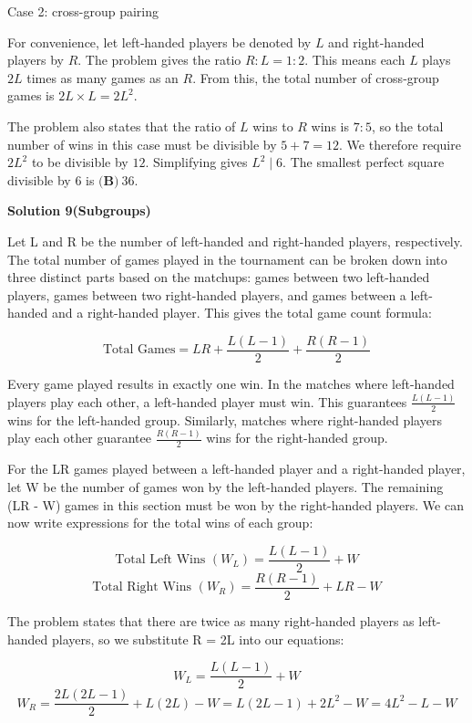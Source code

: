 \begin{enumerate}
 
Case 2: cross-group pairing

 
For convenience, let left‑handed players be denoted by \(L\) and right‑handed players by \(R\). The problem gives the ratio \(R : L = 1 : 2\). This means each \(L\) plays \(2L\) times as many games as an \(R\). From this, the total number of cross‑group games is \(2L \times L = 2L^2\).

 The problem also states that the ratio of \(L\) wins to \(R\) wins is \(7:5\), so the total number of wins in this case must be divisible by \(5 + 7 = 12\). We therefore require \(2L^2\) to be divisible by \(12\). Simplifying gives \(L^2 \mid 6\). The smallest perfect square divisible by \(6\) is \(\boxed{\textbf{(B)}\ 36}\).

 



\textbf{Solution 9(Subgroups)}

Let L and R be the number of left-handed and right-handed players, respectively. The total number of games played in the tournament can be broken down into three distinct parts based on the matchups: games between two left-handed players, games between two right-handed players, and games between a left-handed and a right-handed player. This gives the total game count formula:

 
 \[\text{Total Games} = LR + \frac{L(L-1)}{2} + \frac{R(R-1)}{2}\]

 Every game played results in exactly one win. In the matches where left-handed players play each other, a left-handed player must win. This guarantees $\frac{L(L-1)}{2}$ wins for the left-handed group. Similarly, matches where right-handed players play each other guarantee $\frac{R(R-1)}{2}$ wins for the right-handed group. 

 For the LR games played between a left-handed player and a right-handed player, let W be the number of games won by the left-handed players. The remaining (LR - W) games in this section must be won by the right-handed players. We can now write expressions for the total wins of each group:

 
 \[\text{Total Left Wins } (W_L) = \frac{L(L-1)}{2} + W\]
 \[\text{Total Right Wins } (W_R) = \frac{R(R-1)}{2} + LR - W\]

 The problem states that there are twice as many right-handed players as left-handed players, so we substitute R = 2L into our equations:

 
 \[W_L = \frac{L(L-1)}{2} + W\]
 \[W_R = \frac{2L(2L-1)}{2} + L(2L) - W = L(2L-1) + 2L^2 - W = 4L^2 - L - W\]


\end{enumerate}
